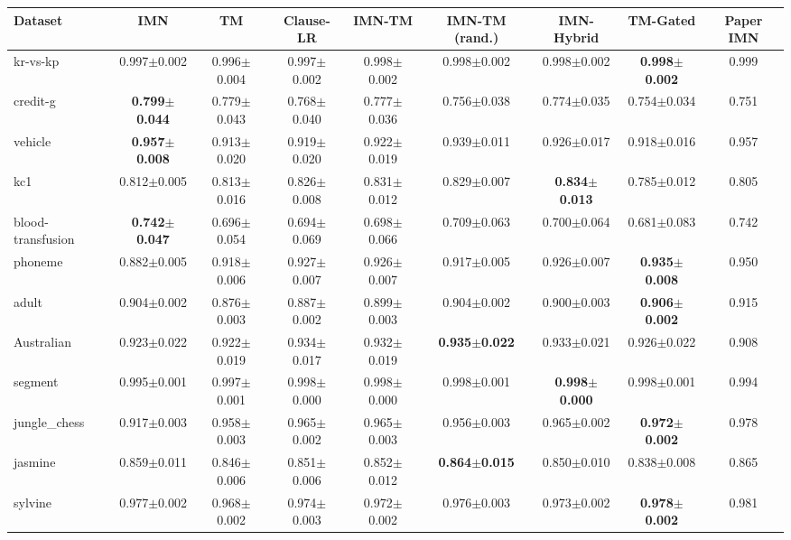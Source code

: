 \begin{tabular}{lcccccccc}
\toprule
Dataset & IMN & TM & Clause-LR & IMN-TM & IMN-TM (rand.) & IMN-Hybrid & TM-Gated & Paper IMN \\
\midrule
kr-vs-kp & 0.997{\tiny$\pm$0.002} & 0.996{\tiny$\pm$0.004} & 0.997{\tiny$\pm$0.002} & 0.998{\tiny$\pm$0.002} & 0.998{\tiny$\pm$0.002} & 0.998{\tiny$\pm$0.002} & \textbf{0.998{\tiny$\pm$0.002}} & 0.999 \\
credit-g & \textbf{0.799{\tiny$\pm$0.044}} & 0.779{\tiny$\pm$0.043} & 0.768{\tiny$\pm$0.040} & 0.777{\tiny$\pm$0.036} & 0.756{\tiny$\pm$0.038} & 0.774{\tiny$\pm$0.035} & 0.754{\tiny$\pm$0.034} & 0.751 \\
vehicle & \textbf{0.957{\tiny$\pm$0.008}} & 0.913{\tiny$\pm$0.020} & 0.919{\tiny$\pm$0.020} & 0.922{\tiny$\pm$0.019} & 0.939{\tiny$\pm$0.011} & 0.926{\tiny$\pm$0.017} & 0.918{\tiny$\pm$0.016} & 0.957 \\
kc1 & 0.812{\tiny$\pm$0.005} & 0.813{\tiny$\pm$0.016} & 0.826{\tiny$\pm$0.008} & 0.831{\tiny$\pm$0.012} & 0.829{\tiny$\pm$0.007} & \textbf{0.834{\tiny$\pm$0.013}} & 0.785{\tiny$\pm$0.012} & 0.805 \\
blood-transfusion & \textbf{0.742{\tiny$\pm$0.047}} & 0.696{\tiny$\pm$0.054} & 0.694{\tiny$\pm$0.069} & 0.698{\tiny$\pm$0.066} & 0.709{\tiny$\pm$0.063} & 0.700{\tiny$\pm$0.064} & 0.681{\tiny$\pm$0.083} & 0.742 \\
phoneme & 0.882{\tiny$\pm$0.005} & 0.918{\tiny$\pm$0.006} & 0.927{\tiny$\pm$0.007} & 0.926{\tiny$\pm$0.007} & 0.917{\tiny$\pm$0.005} & 0.926{\tiny$\pm$0.007} & \textbf{0.935{\tiny$\pm$0.008}} & 0.950 \\
adult & 0.904{\tiny$\pm$0.002} & 0.876{\tiny$\pm$0.003} & 0.887{\tiny$\pm$0.002} & 0.899{\tiny$\pm$0.003} & 0.904{\tiny$\pm$0.002} & 0.900{\tiny$\pm$0.003} & \textbf{0.906{\tiny$\pm$0.002}} & 0.915 \\
Australian & 0.923{\tiny$\pm$0.022} & 0.922{\tiny$\pm$0.019} & 0.934{\tiny$\pm$0.017} & 0.932{\tiny$\pm$0.019} & \textbf{0.935{\tiny$\pm$0.022}} & 0.933{\tiny$\pm$0.021} & 0.926{\tiny$\pm$0.022} & 0.908 \\
segment & 0.995{\tiny$\pm$0.001} & 0.997{\tiny$\pm$0.001} & 0.998{\tiny$\pm$0.000} & 0.998{\tiny$\pm$0.000} & 0.998{\tiny$\pm$0.001} & \textbf{0.998{\tiny$\pm$0.000}} & 0.998{\tiny$\pm$0.001} & 0.994 \\
jungle\_chess & 0.917{\tiny$\pm$0.003} & 0.958{\tiny$\pm$0.003} & 0.965{\tiny$\pm$0.002} & 0.965{\tiny$\pm$0.003} & 0.956{\tiny$\pm$0.003} & 0.965{\tiny$\pm$0.002} & \textbf{0.972{\tiny$\pm$0.002}} & 0.978 \\
jasmine & 0.859{\tiny$\pm$0.011} & 0.846{\tiny$\pm$0.006} & 0.851{\tiny$\pm$0.006} & 0.852{\tiny$\pm$0.012} & \textbf{0.864{\tiny$\pm$0.015}} & 0.850{\tiny$\pm$0.010} & 0.838{\tiny$\pm$0.008} & 0.865 \\
sylvine & 0.977{\tiny$\pm$0.002} & 0.968{\tiny$\pm$0.002} & 0.974{\tiny$\pm$0.003} & 0.972{\tiny$\pm$0.002} & 0.976{\tiny$\pm$0.003} & 0.973{\tiny$\pm$0.002} & \textbf{0.978{\tiny$\pm$0.002}} & 0.981 \\
\bottomrule
\end{tabular}
